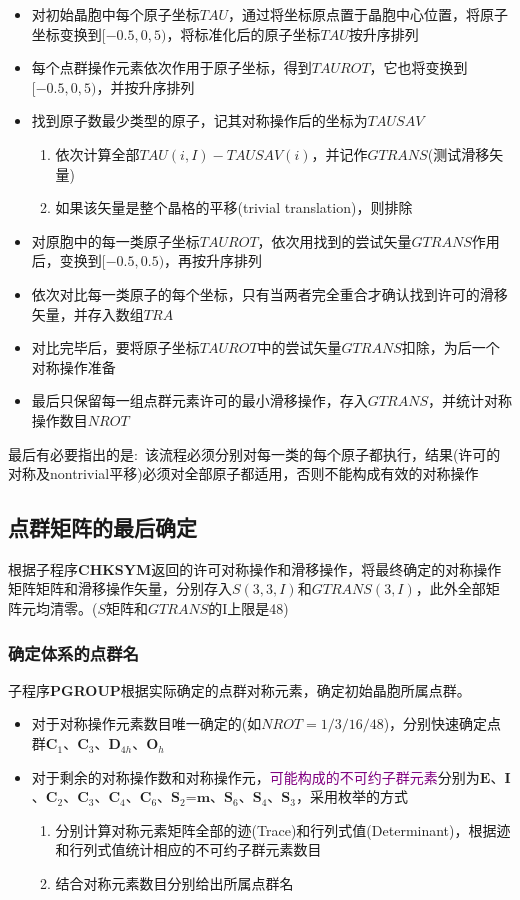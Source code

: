 \begin{itemize}
	\item 对初始晶胞中每个原子坐标$\mathit{TAU}$，通过将坐标原点置于晶胞中心位置，将原子坐标变换到$[-0.5,0,5)$，将标准化后的原子坐标$\mathit{TAU}$按升序排列
	\item 每个点群操作元素依次作用于原子坐标，得到$\mathit{TAUROT}$，它也将变换到$[-0.5,0,5)$，并按升序排列
	\item 找到原子数最少类型的原子，记其对称操作后的坐标为$\mathit{TAUSAV}$
		\begin{enumerate}
			\item 依次计算全部$\mathit{TAU}(i,I)-\mathit{TAUSAV(i)}$，并记作$\mathit{GTRANS}$(测试滑移矢量)
			\item 如果该矢量是整个晶格的平移(\textrm{trivial translation})，则排除
		\end{enumerate}
	\item 对原胞中的每一类原子坐标$TAUROT$，依次用找到的尝试矢量$\mathit{GTRANS}$作用后，变换到$[-0.5,0.5)$，再按升序排列
	\item 依次对比每一类原子的每个坐标，只有当两者完全重合才确认找到许可的滑移矢量，并存入数组$\mathit{TRA}$
	\item 对比完毕后，要将原子坐标$TAUROT$中的尝试矢量$\mathit{GTRANS}$扣除，为后一个对称操作准备
	\item 最后只保留每一组点群元素许可的最小滑移操作，存入$\mathit{GTRANS}$，并统计对称操作数目$\mathit{NROT}$
\end{itemize}
最后有必要指出的是:~该流程必须分别对每一类的每个原子都执行，结果(许可的对称及nontrivial平移)必须对全部原子都适用，否则不能构成有效的对称操作
\subsection{点群矩阵的最后确定}
根据子程序\textbf{CHKSYM}返回的许可对称操作和滑移操作，将最终确定的对称操作矩阵矩阵和滑移操作矢量，分别存入$\mathit{S}(3,3,I)$和$\mathit{GTRANS(3,I)}$，此外全部矩阵元均清零。($\mathit{S}$矩阵和$\mathit{GTRANS}$的I上限是48)
\subsubsection{确定体系的点群名}
子程序\textbf{PGROUP}根据实际确定的点群对称元素，确定初始晶胞所属点群。
\begin{itemize}
	\item 对于对称操作元素数目唯一确定的(如$\mathit{NROT}=1/3/16/48$)，分别快速确定点群$\mathbf{C}_1$、$\mathbf{C}_3$、$\mathbf{D}_{4h}$、$\mathbf{O}_h$
	\item 对于剩余的对称操作数和对称操作元，\textcolor{purple}{可能构成的不可约子群元素}分别为$\mathbf{E}$、$\mathbf{I}$、$\mathbf{C}_2$、$\mathbf{C}_3$、$\mathbf{C}_4$、$\mathbf{C}_6$、$\mathbf{S}_2$=$\mathbf{m}$、$\mathbf{S}_6$、$\mathbf{S}_4$、$\mathbf{S}_3$，采用枚举的方式
		\begin{enumerate}
			\item 分别计算对称元素矩阵全部的迹(\textrm{Trace})和行列式值(\textrm{Determinant})，根据迹和行列式值统计相应的不可约子群元素数目
			\item 结合对称元素数目分别给出所属点群名
		\end{enumerate}
\end{itemize}

